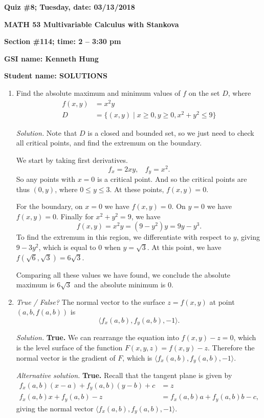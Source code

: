 \documentclass{article}
\begin{document}
{\bf Quiz \#8; Tuesday, date: 03/13/2018}

{\bf MATH 53 Multivariable Calculus with Stankova}

{\bf Section \#114; time: 2 -- 3:30 pm}

{\bf GSI name: Kenneth Hung}

{\bf Student name: SOLUTIONS}

\vspace*{0.25in}

\begin{enumerate}
\item Find the absolute maximum and minimum values of $f$ on the set $D$, where
\begin{align*}
f(x, y) & = x^2 y \\
D & = \{(x, y) \;|\; x \ge 0, y \ge 0, x^2 + y^2 \le 9\}
\end{align*}

{\em Solution.} Note that $D$ is a closed and bounded set, so we just need to check all critical points, and find the extremum on the boundary.

We start by taking first derivatives.
\[
f_x = 2xy, ~~~~ f_y = x^2.
\]
So any points with $x = 0$ is a critical point. And so the critical points are thus $(0, y)$, where $0 \le y \le 3$. At these points, $f(x, y) = 0$.

For the boundary, on $x = 0$ we have $f(x, y) = 0$. On $y = 0$ we have $f(x, y) = 0$. Finally for $x^2 + y^2 = 9$, we have
\[
f(x, y) = x^2 y = (9 - y^2) y = 9y - y^3.
\]
To find the extremum in this region, we differentiate with respect to $y$, giving $9 - 3y^2$, which is equal to $0$ when $y = \sqrt{3}$. At this point, we have $f(\sqrt{6}, \sqrt{3}) = 6 \sqrt{3}$.

Comparing all these values we have found, we conclude the absolute maximum is $6 \sqrt{3}$ and the absolute minimum is $0$.

\item {\em True / False?} The normal vector to the surface $z = f(x, y)$ at point $(a, b, f(a, b))$ is
\[
\langle f_x(a, b), f_y(a, b), -1\rangle.
\]

{\em Solution.} {\bf True.} We can rearrange the equation into $f(x, y) - z = 0$, which is the level surface of the function $F(x, y, z) = f(x, y) - z$. Therefore the normal vector is the gradient of $F$, which is $\langle f_x(a, b), f_y(a, b), -1\rangle$.

{\em Alternative solution.} {\bf True.} Recall that the tangent plane is given by
\begin{align*}
f_x(a, b) (x - a) + f_y(a, b) (y - b) + c & = z \\
f_x(a, b) x + f_y(a, b) - z & = f_x(a, b) a + f_y(a, b) b - c,
\end{align*}
giving the normal vector $\langle f_x(a, b), f_y(a, b), -1\rangle$.


\end{enumerate}
\end{document}
